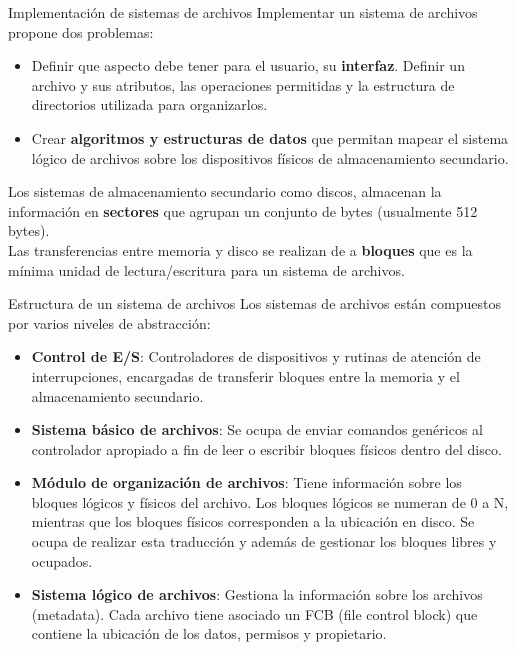 \documentclass[aspectratio=169]{beamer}
\begin{document}
\begin{frame}[fragile,t]{Implementación de sistemas de archivos}
    Implementar un sistema de archivos propone dos problemas:
    \bigskip
    \pause
    \begin{itemize}
    \setlength\itemsep{0.4cm}
    \item Definir que aspecto debe tener para el usuario, su \textbf{interfaz}. Definir un archivo y sus atributos, las operaciones permitidas y la estructura de directorios utilizada para organizarlos.
    \item Crear \textbf{algoritmos y estructuras de datos} que permitan mapear el sistema lógico de archivos sobre los dispositivos físicos de almacenamiento secundario.
    \end{itemize}
    \bigskip
    \pause
    Los sistemas de almacenamiento secundario como discos, almacenan la información en \textbf{sectores} que agrupan un conjunto de bytes (usualmente 512 bytes).\\
    \bigskip
    Las transferencias entre memoria y disco se realizan de a \textbf{bloques} que es la mínima unidad de lectura/escritura para un sistema de archivos.
\end{frame}

\begin{frame}[fragile,t]{Estructura de un sistema de archivos}
    Los sistemas de archivos están compuestos por varios niveles de abstracción:
    \bigskip
    \pause
    \begin{itemize}
    \setlength\itemsep{0.2cm}
    \item \textbf{Control de E/S}:
    Controladores de dispositivos y rutinas de atención de interrupciones, encargadas de transferir bloques entre la memoria y el almacenamiento secundario.
    \pause
    \item \textbf{Sistema básico de archivos}:
    Se ocupa de enviar comandos genéricos al controlador apropiado a fin de leer o escribir bloques físicos dentro del disco.
    \pause
    \item \textbf{Módulo de organización de archivos}:
    Tiene información sobre los bloques lógicos y físicos del archivo. Los bloques lógicos se numeran de 0 a N, mientras que los bloques físicos corresponden a la ubicación en disco. Se ocupa de realizar esta traducción y además de gestionar los bloques libres y ocupados.
    \pause
    \item \textbf{Sistema lógico de archivos}:
    Gestiona la información sobre los archivos (metadata). Cada archivo tiene asociado un FCB (file control block) que contiene la ubicación de los datos, permisos y propietario.
    \end{itemize}
\end{frame}
\end{document}
